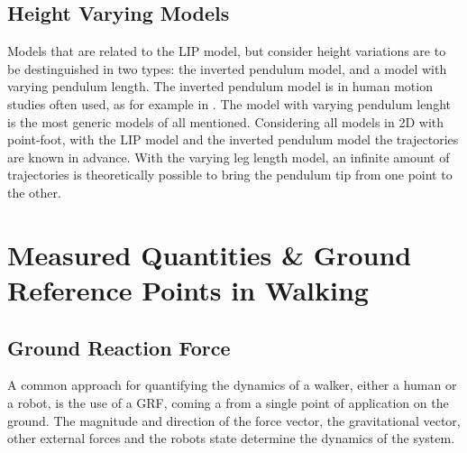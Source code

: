 \subsection{Height Varying Models}
Models that are related to the \ac{LIP} model, but consider height variations are to be destinguished in two types: the inverted pendulum model, and a model with varying pendulum length. The inverted pendulum model is in human motion studies often used, as for example in \cite{kuo2005energetic}. The model with varying pendulum lenght is the most generic models of all mentioned. Considering all models in \ac{2D} with point-foot, with the \ac{LIP} model and the inverted pendulum model the trajectories are known in advance. With the varying leg length model, an infinite amount of trajectories is theoretically possible to bring the pendulum tip from one point to the other.
\section{Measured Quantities \& Ground Reference Points in Walking}

\subsection{Ground Reaction Force}
A common approach for quantifying the dynamics of a walker, either a human or a robot, is the use of a \ac{GRF}, coming a from a single point of application on the ground. The magnitude and direction of the force vector, the gravitational vector, other external forces and the robots state determine the dynamics of the system. 


